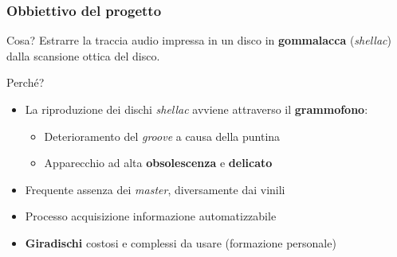 \begin{frame}

\frametitle{Obbiettivo del progetto}

\begin{block}{Cosa?}
Estrarre la traccia audio impressa in un disco in \textbf{gommalacca}
(\emph{shellac}) dalla scansione ottica del disco.
\end{block}

\begin{block}{Perché?}
\begin{itemize}
\item La riproduzione dei dischi \emph{shellac} avviene attraverso il \textbf{grammofono}:
\vspace{-0.4cm}
\begin{itemize}
\item Deterioramento del \emph{groove} a causa della puntina
\item Apparecchio ad alta \textbf{obsolescenza} e \textbf{delicato}
\end{itemize}
\item Frequente assenza dei \emph{master}, diversamente dai vinili
\item Processo acquisizione informazione automatizzabile
\item \textbf{Giradischi} costosi e complessi da usare (formazione personale)
\end{itemize}
\end{block}

\end{frame}
